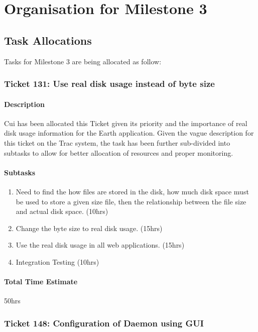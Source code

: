 \documentclass[10pt,a4,oneside]{article}
\begin{document}
\newpage

\section{Organisation for Milestone 3}
 
\label{sec:g1org}

\subsection{Task Allocations}

Tasks for Milestone 3 are being allocated as follow:
 
\subsubsection{Ticket 131: Use real disk usage instead of byte size}

\paragraph{Description}
Cui has been allocated this Ticket given its priority and the 
importance of real disk usage information for the Earth application. 
Given the vague description for this ticket on the Trac system,
the task has been further sub-divided into subtasks to allow for
better allocation of resources and proper monitoring.

\paragraph{Subtasks}
\noindent
\begin{enumerate}
\item Need to find the how files are stored in the disk, how much 
disk space must be used to store a given size file, then the relationship 
between the file size and actual disk space. (10hrs)
\item Change the byte size to real disk usage. (15hrs)
\item Use the real disk usage in all web applications. (15hrs)
\item Integration Testing (10hrs)
\end{enumerate}

\paragraph{Total Time Estimate} 50hrs


\subsubsection{Ticket 148: Configuration of Daemon using GUI}
\end{document}
